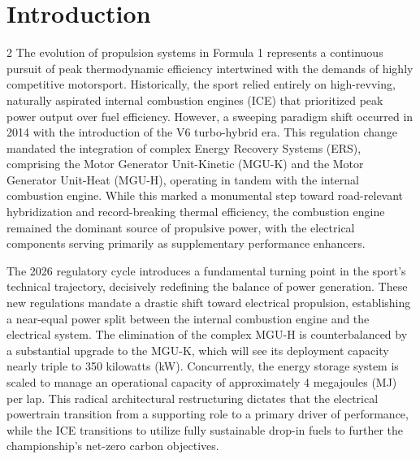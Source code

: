 \section{Introduction}

\begin{multicols}{2}
The evolution of propulsion systems in Formula 1 represents a continuous pursuit of peak thermodynamic efficiency intertwined with the demands of highly competitive motorsport. Historically, the sport relied entirely on high-revving, naturally aspirated internal combustion engines (ICE) that prioritized peak power output over fuel efficiency. However, a sweeping paradigm shift occurred in 2014 with the introduction of the V6 turbo-hybrid era. This regulation change mandated the integration of complex Energy Recovery Systems (ERS), comprising the Motor Generator Unit-Kinetic (MGU-K) and the Motor Generator Unit-Heat (MGU-H), operating in tandem with the internal combustion engine. While this marked a monumental step toward road-relevant hybridization and record-breaking thermal efficiency, the combustion engine remained the dominant source of propulsive power, with the electrical components serving primarily as supplementary performance enhancers.

The 2026 regulatory cycle introduces a fundamental turning point in the sport's technical trajectory, decisively redefining the balance of power generation. These new regulations mandate a drastic shift toward electrical propulsion, establishing a near-equal power split between the internal combustion engine and the electrical system. The elimination of the complex MGU-H is counterbalanced by a substantial upgrade to the MGU-K, which will see its deployment capacity nearly triple to 350 kilowatts (kW). Concurrently, the energy storage system is scaled to manage an operational capacity of approximately 4 megajoules (MJ) per lap. This radical architectural restructuring dictates that the electrical powertrain transition from a supporting role to a primary driver of performance, while the ICE transitions to utilize fully sustainable drop-in fuels to further the championship's net-zero carbon objectives.


\end{multicols}
